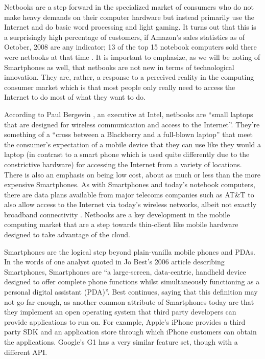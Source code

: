 Netbooks are a step forward in the specialized market of consumers who do not
make heavy demands on their computer hardware but instead primarily use the
Internet and do basic word processing and light gaming.  It turns out that this
is a surprisingly high percentage of customers, if Amazon's sales statistics as
of October, 2008 are any indicator; 13 of the top 15 notebook computers sold
there were netbooks at that time \citep{copeland2008}.  It is important to
emphasize, as we will be noting of Smartphones as well, that netbooks are not
new in terms of technological innovation.  They are, rather, a response to a
perceived reality in the computing consumer market which is that most people
only really need to access the Internet to do most of what they want to do.

According to Paul Bergevin \citeyearpar{bergevin2008}, an executive at Intel,
netbooks are ``small laptops that are designed for wireless communication and
access to the Internet''.  They're something of a ``cross between a Blackberry
and a full-blown laptop'' \citep{copeland2008} that meet the consumer's
expectation of a mobile device that they can use like they would a laptop (in
contrast to a smart phone which is used quite differently due to the
constrictive hardware) for accessing the Internet from a variety of locations.
There is also an emphasis on being low cost, about as much or less than the more
expensive Smartphones.  As with Smartphones and today's notebook computers,
there are data plans available from major telecoms companies such as AT\&T to
also allow access to the Internet via today's wireless networks, albeit not
exactly broadband connectivity \citep{ap2009}.  Netbooks are a key development
in the mobile computing market that are a step towards thin-client like mobile
hardware designed to take advantage of the cloud.

Smartphones are the logical step beyond plain-vanilla mobile phones and PDAs.
In the words of one analyst quoted in Jo Best's 2006 article describing
Smartphones, Smartphones are ``a large-screen, data-centric, handheld device
designed to offer complete phone functions whilst simultaneously functioning as
a personal digital assistant (PDA)''.  Best continues, saying that this
definition may not go far enough, as another common attribute of Smartphones
today are that they implement an open operating system that third party
developers can provide applications to run on.  For example, Apple's iPhone
provides a third party SDK and an application store through which iPhone
customers can obtain the applications.  Google's G1 has a very similar feature
set, though with a different API.


